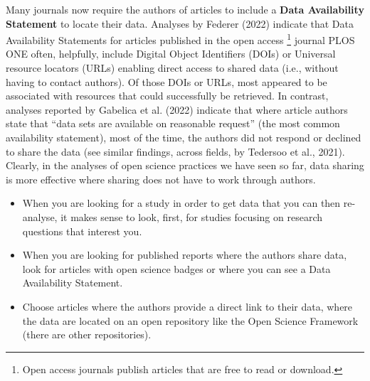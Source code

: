 \documentclass[
  letterpaper,
  DIV=11,
  numbers=noendperiod]{scrreprt}
\providecommand{\tightlist}{%
  \setlength{\itemsep}{0pt}\setlength{\parskip}{0pt}}\usepackage{longtable,booktabs,array}
\begin{document}
Many journals now require the authors of articles to include a
\textbf{Data Availability Statement} to locate their data. Analyses by
Federer (2022) indicate that Data Availability Statements for articles
published in the open access \footnote{Open access journals publish
  articles that are free to read or download.} journal PLOS ONE often,
helpfully, include Digital Object Identifiers (DOIs) or Universal
resource locators (URLs) enabling direct access to shared data (i.e.,
without having to contact authors). Of those DOIs or URLs, most appeared
to be associated with resources that could successfully be retrieved. In
contrast, analyses reported by Gabelica et al. (2022) indicate that
where article authors state that ``data sets are available on reasonable
request'' (the most common availability statement), most of the time,
the authors did not respond or declined to share the data (see similar
findings, across fields, by Tedersoo et al., 2021). Clearly, in the
analyses of open science practices we have seen so far, data sharing is
more effective where sharing does not have to work through authors.

\begin{tcolorbox}[enhanced jigsaw, opacitybacktitle=0.6, title=\textcolor{quarto-callout-tip-color}{\faLightbulb}\hspace{0.5em}{Tip}, arc=.35mm, colbacktitle=quarto-callout-tip-color!10!white, colframe=quarto-callout-tip-color-frame, leftrule=.75mm, opacityback=0, breakable, titlerule=0mm, left=2mm, bottomrule=.15mm, toprule=.15mm, colback=white, coltitle=black, bottomtitle=1mm, toptitle=1mm, rightrule=.15mm]

\begin{itemize}
\tightlist
\item
  When you are looking for a study in order to get data that you can
  then re-analyse, it makes sense to look, first, for studies focusing
  on research questions that interest you.
\item
  When you are looking for published reports where the authors share
  data, look for articles with open science badges or where you can see
  a Data Availability Statement.
\item
  Choose articles where the authors provide a direct link to their data,
  where the data are located on an open repository like the Open Science
  Framework (there are other repositories).
\end{itemize}

\end{tcolorbox}
\end{document}
